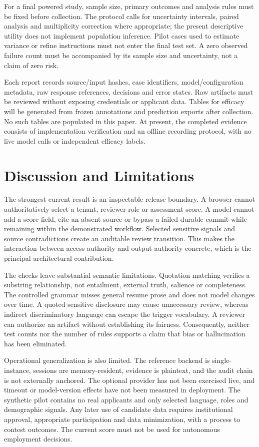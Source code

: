 \documentclass[conference]{IEEEtran}
\begin{document}
For a final powered study, sample size, primary outcomes and analysis rules must be fixed before collection. The protocol calls for uncertainty intervals, paired analysis and multiplicity correction where appropriate; the present descriptive utility does not implement population inference. Pilot cases used to estimate variance or refine instructions must not enter the final test set. A zero observed failure count must be accompanied by its sample size and uncertainty, not a claim of zero risk.

Each report records source/input hashes, case identifiers, model/configuration metadata, raw response references, decisions and error states. Raw artifacts must be reviewed without exposing credentials or applicant data. Tables for efficacy will be generated from frozen annotations and prediction exports after collection. No such tables are populated in this paper. At present, the completed evidence consists of implementation verification and an offline recording protocol, with no live model calls or independent efficacy labels.

\section{Discussion and Limitations}
The strongest current result is an inspectable release boundary. A browser cannot authoritatively select a tenant, reviewer role or assessment score. A model cannot add a score field, cite an absent source or bypass a failed durable commit while remaining within the demonstrated workflow. Selected sensitive signals and source contradictions create an auditable review transition. This makes the interaction between access authority and output authority concrete, which is the principal architectural contribution.

The checks leave substantial semantic limitations. Quotation matching verifies a substring relationship, not entailment, external truth, salience or completeness. The controlled grammar misses general resume prose and does not model changes over time. A quoted sensitive disclosure may cause unnecessary review, whereas indirect discriminatory language can escape the trigger vocabulary. A reviewer can authorize an artifact without establishing its fairness. Consequently, neither test counts nor the number of rules supports a claim that bias or hallucination has been eliminated.

Operational generalization is also limited. The reference backend is single-instance, sessions are memory-resident, evidence is plaintext, and the audit chain is not externally anchored. The optional provider has not been exercised live, and timeout or model-version effects have not been measured in deployment. The synthetic pilot contains no real applicants and only selected language, roles and demographic signals. Any later use of candidate data requires institutional approval, appropriate participation and data minimization, with a process to contest outcomes. The current score must not be used for autonomous employment decisions.
\end{document}
